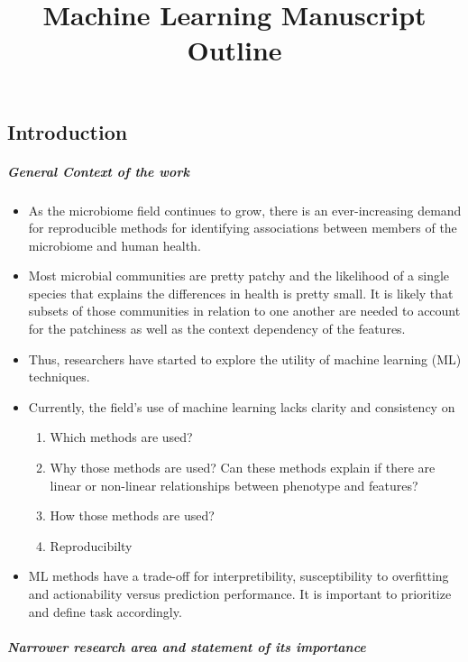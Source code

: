 \documentclass[11pt,]{article}
\title{Machine Learning Manuscript Outline}
\author{}
\date{}
\providecommand{\tightlist}{%
  \setlength{\itemsep}{0pt}\setlength{\parskip}{0pt}}
\let\oldsubparagraph\subparagraph
\renewcommand{\subparagraph}[1]{\oldsubparagraph{#1}\mbox{}}
\begin{document}
\maketitle

\subsection{Introduction}\label{introduction}

\subparagraph{General Context of the
work}\label{general-context-of-the-work}

\begin{itemize}
\item
  As the microbiome field continues to grow, there is an ever-increasing
  demand for reproducible methods for identifying associations between
  members of the microbiome and human health.
\item
  Most microbial communities are pretty patchy and the likelihood of a
  single species that explains the differences in health is pretty
  small. It is likely that subsets of those communities in relation to
  one another are needed to account for the patchiness as well as the
  context dependency of the features.
\item
  Thus, researchers have started to explore the utility of machine
  learning (ML) techniques.
\item
  Currently, the field's use of machine learning lacks clarity and
  consistency on

  \begin{enumerate}
  \def\labelenumi{\arabic{enumi}.}
  \tightlist
  \item
    Which methods are used?
  \item
    Why those methods are used? Can these methods explain if there are
    linear or non-linear relationships between phenotype and features?
  \item
    How those methods are used?
  \item
    Reproducibilty
  \end{enumerate}
\item
  ML methods have a trade-off for interpretibility, susceptibility to
  overfitting and actionability versus prediction performance. It is
  important to prioritize and define task accordingly.
\end{itemize}

\subparagraph{Narrower research area and statement of its
importance}\label{narrower-research-area-and-statement-of-its-importance}
\end{document}

